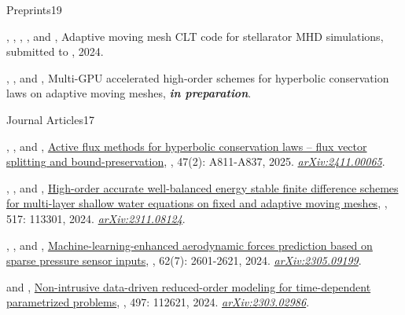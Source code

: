 %
\begin{cvpublicationsection}{Preprints}{19}
%
\item {}, , , , and , Adaptive moving mesh CLT code for stellarator MHD simulations, submitted to , 2024.
%
\item {}, , and , Multi-GPU accelerated high-order schemes for hyperbolic conservation laws on adaptive moving meshes, {\em\bfseries in preparation}.
\end{cvpublicationsection}
\begin{cvpublicationsection}{Journal Articles}{17}
%
\item {}, , and , \href{https://doi.org/10.1137/24M1658887}{Active flux methods for hyperbolic conservation laws -- flux vector splitting and bound-preservation}, , 47(2): A811-A837, 2025. \href{https://arxiv.org/abs/2411.00065}{\em arXiv:2411.00065}.
%
\item {}, , and , \href{https://doi.org/10.1016/j.jcp.2024.113301}{High-order accurate well-balanced energy stable finite difference schemes for multi-layer shallow water equations on fixed and adaptive moving meshes}, , 517: 113301, 2024. \href{https://arxiv.org/abs/2311.08124}{\em arXiv:2311.08124}.
%
\item {}, , and , \href{https://doi.org/10.2514/1.J063183}{Machine-learning-enhanced aerodynamic forces prediction based on sparse pressure sensor inputs}, , 62(7): 2601-2621, 2024. \href{https://arxiv.org/abs/2305.09199}{\em arXiv:2305.09199}.
%
\item {} and , \href{https://doi.org/10.1016/j.jcp.2023.112621}{Non-intrusive data-driven reduced-order modeling for time-dependent parametrized problems}, , 497: 112621, 2024. \href{https://arxiv.org/abs/2303.02986}{\em arXiv:2303.02986}.

\end{cvpublicationsection}
